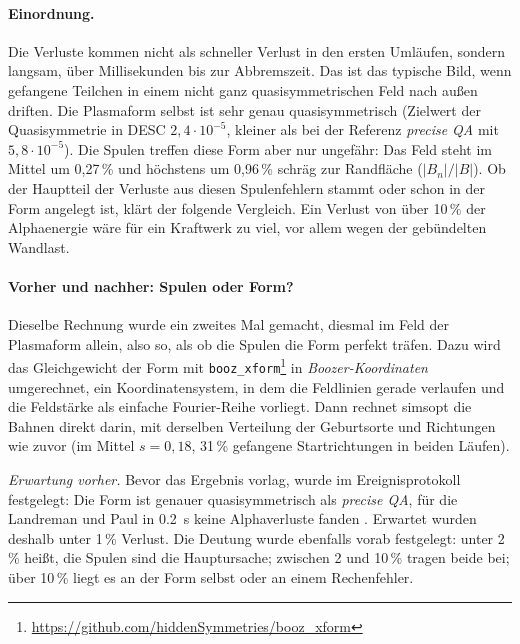 \paragraph{Einordnung.} Die Verluste kommen nicht als schneller Verlust in den ersten Umläufen, sondern langsam, über
Millisekunden bis zur Abbremszeit. Das ist das typische Bild, wenn gefangene Teilchen in einem nicht ganz
quasisymmetrischen Feld nach außen driften. Die Plasmaform selbst ist sehr genau quasisymmetrisch (Zielwert
der Quasisymmetrie in DESC $2{,}4\cdot10^{-5}$, kleiner als bei der Referenz \emph{precise QA} mit
$5{,}8\cdot10^{-5}$). Die Spulen treffen diese Form aber nur ungefähr: Das Feld steht im Mittel um 0,27\,\% und
höchstens um 0,96\,\% schräg zur Randfläche ($|B_n|/|B|$). Ob der Hauptteil der Verluste aus diesen Spulenfehlern stammt oder schon in der Form angelegt ist,
klärt der folgende Vergleich. Ein Verlust von über 10\,\% der Alphaenergie wäre für ein Kraftwerk zu viel, vor allem
wegen der gebündelten Wandlast.

\paragraph{Vorher und nachher: Spulen oder Form?} Dieselbe Rechnung wurde ein zweites Mal gemacht, diesmal im Feld der
Plasmaform allein, also so, als ob die Spulen die Form perfekt träfen. Dazu wird das Gleichgewicht der Form mit
\texttt{booz\_xform}\footnote{\url{https://github.com/hiddenSymmetries/booz_xform}} in
\emph{Boozer-Koordinaten} umgerechnet, ein Koordinatensystem, in dem die Feldlinien gerade verlaufen und die
Feldstärke als einfache Fourier-Reihe vorliegt. Dann rechnet simsopt die Bahnen direkt darin, mit derselben
Verteilung der Geburtsorte und Richtungen wie zuvor (im Mittel $s = 0{,}18$, 31\,\% gefangene Startrichtungen in
beiden Läufen).

\emph{Erwartung vorher.} Bevor das Ergebnis vorlag, wurde im Ereignisprotokoll festgelegt: Die Form ist genauer
quasisymmetrisch als \emph{precise QA}, für die Landreman und Paul in \SI{0,2}{s} keine Alphaverluste fanden
\cite{landreman2022}. Erwartet wurden deshalb unter 1\,\% Verlust. Die Deutung wurde ebenfalls vorab festgelegt:
unter 2\,\% heißt, die Spulen sind die Hauptursache; zwischen 2 und 10\,\% tragen beide bei; über 10\,\% liegt es an
der Form selbst oder an einem Rechenfehler.


